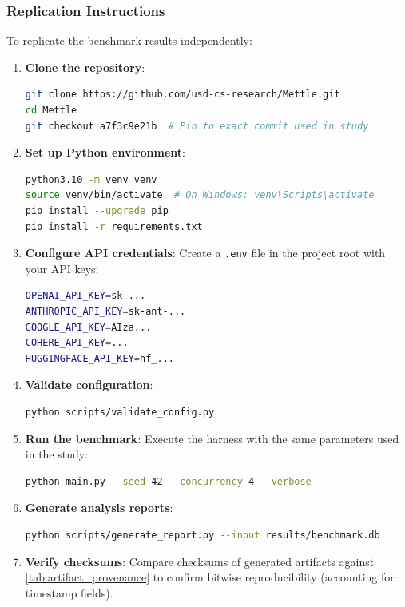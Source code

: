 \subsubsection{Replication Instructions}

To replicate the benchmark results independently:

\begin{enumerate}
\item \textbf{Clone the repository}:
\begin{lstlisting}[language=bash,style=mystyle]
git clone https://github.com/usd-cs-research/Mettle.git
cd Mettle
git checkout a7f3c9e21b  # Pin to exact commit used in study
\end{lstlisting}

\item \textbf{Set up Python environment}:
\begin{lstlisting}[language=bash,style=mystyle]
python3.10 -m venv venv
source venv/bin/activate  # On Windows: venv\Scripts\activate
pip install --upgrade pip
pip install -r requirements.txt
\end{lstlisting}

\item \textbf{Configure API credentials}: Create a \texttt{.env} file in the project root with your API keys:
\begin{lstlisting}[language=bash,style=mystyle]
OPENAI_API_KEY=sk-...
ANTHROPIC_API_KEY=sk-ant-...
GOOGLE_API_KEY=AIza...
COHERE_API_KEY=...
HUGGINGFACE_API_KEY=hf_...
\end{lstlisting}

\item \textbf{Validate configuration}:
\begin{lstlisting}[language=bash,style=mystyle]
python scripts/validate_config.py
\end{lstlisting}

\item \textbf{Run the benchmark}: Execute the harness with the same parameters used in the study:
\begin{lstlisting}[language=bash,style=mystyle]
python main.py --seed 42 --concurrency 4 --verbose
\end{lstlisting}

\item \textbf{Generate analysis reports}:
\begin{lstlisting}[language=bash,style=mystyle]
python scripts/generate_report.py --input results/benchmark.db
\end{lstlisting}

\item \textbf{Verify checksums}: Compare checksums of generated artifacts against \cref{tab:artifact_provenance} to confirm bitwise reproducibility (accounting for timestamp fields).
\end{enumerate}

